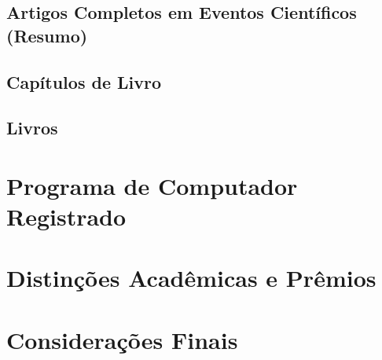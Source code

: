 

\subsection{Artigos Completos em Eventos Científicos (Resumo)}



\subsection{Capítulos de Livro}

\subsection{Livros}

\section{Programa de Computador Registrado}

\section{Distinções Acadêmicas e Prêmios}


\section{Considerações Finais}






